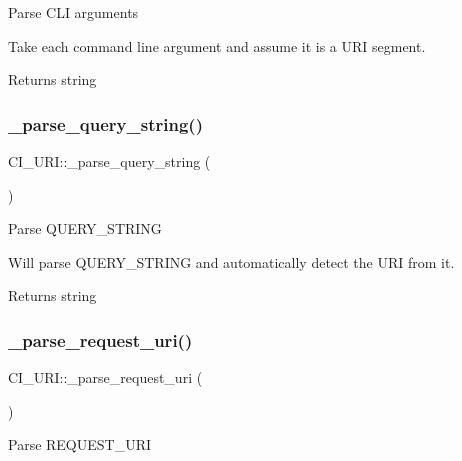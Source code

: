 Parse C\+LI arguments

Take each command line argument and assume it is a U\+RI segment.

\begin{DoxyReturn}{Returns}
string 
\end{DoxyReturn}
\mbox{\label{class_c_i___u_r_i_a9c0e85e7308d364034202fe5f436dcfb}} 
\subsubsection{\texorpdfstring{\+\_\+parse\+\_\+query\+\_\+string()}{\_parse\_query\_string()}}
{\footnotesize\ttfamily C\+I\+\_\+\+U\+R\+I\+::\+\_\+parse\+\_\+query\+\_\+string (\begin{DoxyParamCaption}{ }\end{DoxyParamCaption})\hspace{0.3cm}{\ttfamily [protected]}}

Parse Q\+U\+E\+R\+Y\+\_\+\+S\+T\+R\+I\+NG

Will parse Q\+U\+E\+R\+Y\+\_\+\+S\+T\+R\+I\+NG and automatically detect the U\+RI from it.

\begin{DoxyReturn}{Returns}
string 
\end{DoxyReturn}
\mbox{\label{class_c_i___u_r_i_a748eb53a397eb43f17f861c45164bf52}} 
\subsubsection{\texorpdfstring{\+\_\+parse\+\_\+request\+\_\+uri()}{\_parse\_request\_uri()}}
{\footnotesize\ttfamily C\+I\+\_\+\+U\+R\+I\+::\+\_\+parse\+\_\+request\+\_\+uri (\begin{DoxyParamCaption}{ }\end{DoxyParamCaption})\hspace{0.3cm}{\ttfamily [protected]}}

Parse R\+E\+Q\+U\+E\+S\+T\+\_\+\+U\+RI

